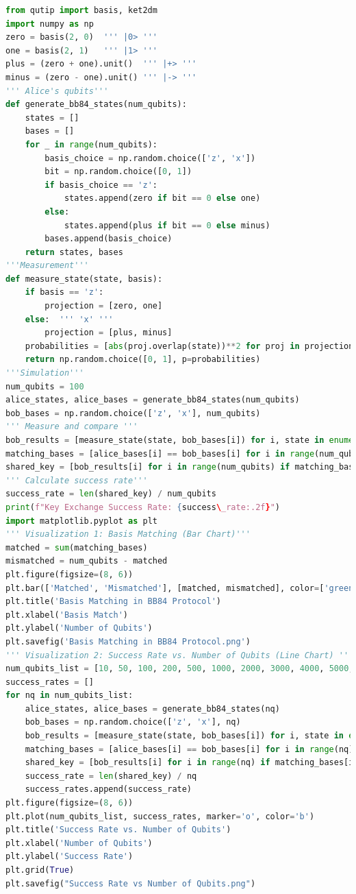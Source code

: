 \documentclass[12pt,a4paper] {report}
\begin{document}
\begin{lstlisting}[language=Python, caption=BB84 for QKD, label=code:QKD]
from qutip import basis, ket2dm
import numpy as np
zero = basis(2, 0)  ''' |0> '''
one = basis(2, 1)   ''' |1> ''' 
plus = (zero + one).unit()  ''' |+> '''
minus = (zero - one).unit() ''' |-> ''' 
''' Alice's qubits'''
def generate_bb84_states(num_qubits):
    states = []
    bases = []
    for _ in range(num_qubits):
        basis_choice = np.random.choice(['z', 'x'])
        bit = np.random.choice([0, 1])
        if basis_choice == 'z':
            states.append(zero if bit == 0 else one)
        else:
            states.append(plus if bit == 0 else minus)
        bases.append(basis_choice)
    return states, bases
'''Measurement'''
def measure_state(state, basis):
    if basis == 'z':
        projection = [zero, one]
    else:  ''' 'x' '''
        projection = [plus, minus]
    probabilities = [abs(proj.overlap(state))**2 for proj in projection]
    return np.random.choice([0, 1], p=probabilities)
'''Simulation'''
num_qubits = 100
alice_states, alice_bases = generate_bb84_states(num_qubits)
bob_bases = np.random.choice(['z', 'x'], num_qubits)
''' Measure and compare '''
bob_results = [measure_state(state, bob_bases[i]) for i, state in enumerate(alice_states)]
matching_bases = [alice_bases[i] == bob_bases[i] for i in range(num_qubits)]
shared_key = [bob_results[i] for i in range(num_qubits) if matching_bases[i]]
''' Calculate success rate'''
success_rate = len(shared_key) / num_qubits
print(f"Key Exchange Success Rate: {success\_rate:.2f}")
import matplotlib.pyplot as plt
''' Visualization 1: Basis Matching (Bar Chart)'''
matched = sum(matching_bases)
mismatched = num_qubits - matched
plt.figure(figsize=(8, 6))
plt.bar(['Matched', 'Mismatched'], [matched, mismatched], color=['green', 'red'])
plt.title('Basis Matching in BB84 Protocol')
plt.xlabel('Basis Match')
plt.ylabel('Number of Qubits')
plt.savefig('Basis Matching in BB84 Protocol.png')
''' Visualization 2: Success Rate vs. Number of Qubits (Line Chart) '''
num_qubits_list = [10, 50, 100, 200, 500, 1000, 2000, 3000, 4000, 5000, 8000, 10000]
success_rates = []
for nq in num_qubits_list:
    alice_states, alice_bases = generate_bb84_states(nq)
    bob_bases = np.random.choice(['z', 'x'], nq)
    bob_results = [measure_state(state, bob_bases[i]) for i, state in enumerate(alice_states)]
    matching_bases = [alice_bases[i] == bob_bases[i] for i in range(nq)]
    shared_key = [bob_results[i] for i in range(nq) if matching_bases[i]]
    success_rate = len(shared_key) / nq
    success_rates.append(success_rate)
plt.figure(figsize=(8, 6))
plt.plot(num_qubits_list, success_rates, marker='o', color='b')
plt.title('Success Rate vs. Number of Qubits')
plt.xlabel('Number of Qubits')
plt.ylabel('Success Rate')
plt.grid(True)
plt.savefig("Success Rate vs Number of Qubits.png")

\end{lstlisting}
\end{document}
